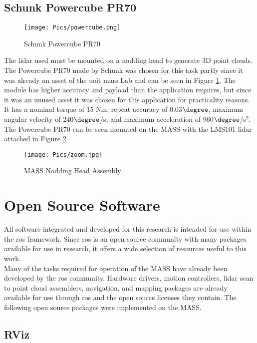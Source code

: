 \subsection{Schunk Powercube PR70}
\begin{figure}[H]
    \centering
    \texttt{[image: Pics/powercube.png]}
    \caption{Schunk Powercube PR70 \cite{schunkpage}}
    \label{fig:schunk}
\end{figure}
The \acrshort{lidar} used must be mounted on a nodding head to generate 3D point clouds. The Powercube PR70 made by Schunk was chosen for this task partly since it was already an asset of the \acrshort{uoit} \acrshort{mars} Lab and can be seen in Figure \ref{fig:schunk}. The module has higher accuracy and payload than the application requires, but since it was an unused asset it was chosen for this application for practicality reasons. It has a nominal torque of 15 Nm, repeat accuracy of 0.03$\degree$, maximum angular velocity of 240$\degree$/s, and maximum acceleration of 960$\degree$/s$^2$. The Powercube PR70 can be seen mounted on the MASS with the LMS101 \acrshort{lidar} attached in Figure \ref{fig:lidarmass}.\\
\begin{figure}[H]
    \centering
    \texttt{[image: Pics/zoom.jpg]}
    \caption{MASS Nodding Head Assembly}
    \label{fig:lidarmass}
\end{figure}
\section{Open Source Software}
\label{sec:software}
All software integrated and developed for this research is intended for use within the \acrshort{ros} framework. Since \acrshort{ros} is an open source community with many packages available for use in research, it offers a wide selection of resources useful to this work.\\

Many of the tasks required for operation of the MASS have already been developed by the \acrshort{ros} community. Hardware drivers, motion controllers, \acrshort{lidar} scan to point cloud assemblers, navigation, and mapping packages are already available for use through \acrshort{ros} and the open source licenses they contain. The following open source packages were implemented on the MASS.\\
\subsection{RViz}
\label{sec:RViz}

